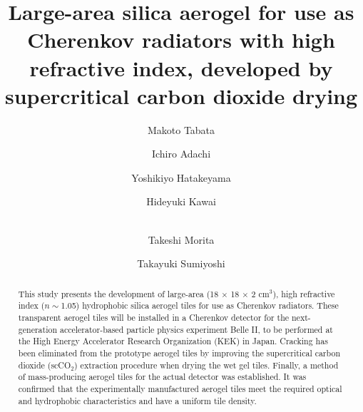 \documentclass[5p,twocolumn]{elsarticle}
\begin{document}
\begin{frontmatter}



\title{Large-area silica aerogel for use as Cherenkov radiators with high refractive index, developed by supercritical carbon dioxide drying}


\author[First]{Makoto Tabata}
\author[Second]{Ichiro Adachi}
\author[Third]{Yoshikiyo Hatakeyama}
\author[First]{Hideyuki Kawai}
\author[Third]{\\Takeshi Morita}
\author[Fourth]{Takayuki Sumiyoshi}

\address[First]{Department of Physics, Chiba University, Chiba 263-8522, Japan}
\address[Second]{Institute of Particle and Nuclear Studies (IPNS), High Energy Accelerator Research Organization (KEK), Tsukuba 305-0801, Japan}
\address[Third]{Graduate School of Advanced Integration Science, Chiba University, Chiba 263-8522, Japan}
\address[Fourth]{Department of Physics, Tokyo Metropolitan University, Hachioji 192-0397, Japan}

\begin{abstract}
This study presents the development of large-area (18 $\times $ 18 $\times $ 2 cm$^3$), high refractive index ($n \sim $1.05) hydrophobic silica aerogel tiles for use as Cherenkov radiators. These transparent aerogel tiles will be installed in a Cherenkov detector for the next-generation accelerator-based particle physics experiment Belle II, to be performed at the High Energy Accelerator Research Organization (KEK) in Japan. Cracking has been eliminated from the prototype aerogel tiles by improving the supercritical carbon dioxide (scCO$_2$) extraction procedure when drying the wet gel tiles. Finally, a method of mass-producing aerogel tiles for the actual detector was established. It was confirmed that the experimentally manufactured aerogel tiles meet the required optical and hydrophobic characteristics and have a uniform tile density.
\end{abstract}


\end{frontmatter}
\end{document}
